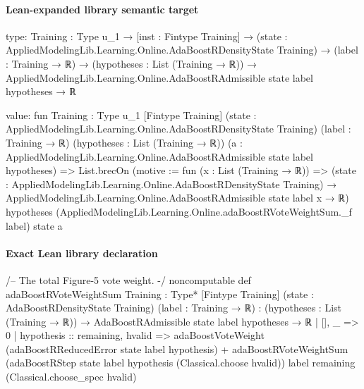 \documentclass[10pt]{article}
\begin{document}
\paragraph{Lean-expanded library semantic target}
\begin{ReviewVerbatim}
type:
{Training : Type u_1} →
  [inst : Fintype Training] →
    (state : AppliedModelingLib.Learning.Online.AdaBoostRDensityState Training) →
      (label : Training → ℝ) →
        (hypotheses : List (Training → ℝ)) →
          AppliedModelingLib.Learning.Online.AdaBoostRAdmissible state label hypotheses → ℝ

value:
fun {Training : Type u_1} [Fintype Training] (state : AppliedModelingLib.Learning.Online.AdaBoostRDensityState Training)
    (label : Training → ℝ) (hypotheses : List (Training → ℝ))
    (a : AppliedModelingLib.Learning.Online.AdaBoostRAdmissible state label hypotheses) =>
  List.brecOn (motive := fun (x : List (Training → ℝ)) =>
    (state : AppliedModelingLib.Learning.Online.AdaBoostRDensityState Training) →
      AppliedModelingLib.Learning.Online.AdaBoostRAdmissible state label x → ℝ)
    hypotheses (AppliedModelingLib.Learning.Online.adaBoostRVoteWeightSum._f label) state a
\end{ReviewVerbatim}

\paragraph{Exact Lean library declaration}
\begin{ReviewVerbatim}
/-- The total Figure-5 vote weight. -/
noncomputable def adaBoostRVoteWeightSum
    {Training : Type*} [Fintype Training]
    (state : AdaBoostRDensityState Training) (label : Training → ℝ) :
    (hypotheses : List (Training → ℝ)) →
      AdaBoostRAdmissible state label hypotheses → ℝ
  | [], _ => 0
  | hypothesis :: remaining, hvalid =>
      adaBoostVoteWeight (adaBoostRReducedError state label hypothesis) +
        adaBoostRVoteWeightSum
          (adaBoostRStep state label hypothesis (Classical.choose hvalid)) label remaining
          (Classical.choose_spec hvalid)
\end{ReviewVerbatim}
\end{document}
